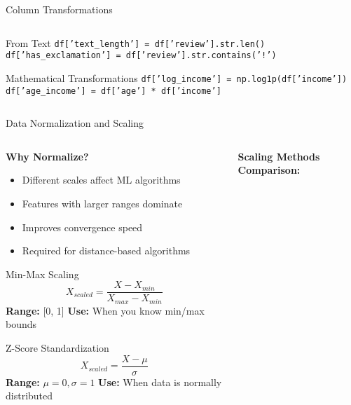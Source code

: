 \documentclass[8pt,aspectratio=1610]{beamer}
\begin{document}
\begin{frame}{Column Transformations}
\begin{columns}[t]
\begin{column}{0.48\textwidth}
\begin{exampleblock}{From Text}
\scriptsize
\texttt{df['text\_length'] = df['review'].str.len()} \\
\texttt{df['has\_exclamation'] = df['review'].str.contains('!')}
\end{exampleblock}

\begin{exampleblock}{Mathematical Transformations}
\scriptsize
\texttt{df['log\_income'] = np.log1p(df['income'])} \\
\texttt{df['age\_income'] = df['age'] * df['income']}
\end{exampleblock}
\end{column}
\end{columns}
\end{frame}

\begin{frame}{Data Normalization and Scaling}
\begin{columns}[t]
\begin{column}{0.48\textwidth}
\textbf{Why Normalize?}
\begin{itemize}
\setlength{\itemsep}{1pt}
\item Different scales affect ML algorithms
\item Features with larger ranges dominate
\item Improves convergence speed
\item Required for distance-based algorithms
\end{itemize}

\vspace{0.3cm}
\begin{block}{Min-Max Scaling}
$$X_{scaled} = \frac{X - X_{min}}{X_{max} - X_{min}}$$
\textbf{Range:} [0, 1]
\textbf{Use:} When you know min/max bounds
\end{block}

\begin{block}{Z-Score Standardization}
$$X_{scaled} = \frac{X - \mu}{\sigma}$$
\textbf{Range:} $\mu = 0, \sigma = 1$
\textbf{Use:} When data is normally distributed
\end{block}
\end{column}

\begin{column}{0.48\textwidth}
\textbf{Scaling Methods Comparison:}
\vspace{0.2cm}

\end{column}
\end{columns}
\end{frame}
\end{document}
